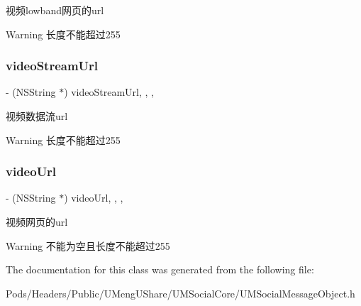 视频lowband网页的url

\begin{DoxyWarning}{Warning}
长度不能超过255 
\end{DoxyWarning}
\mbox{\label{interface_u_m_share_video_object_a540ba23d9e3ede766a837064fa78dead}} 
\subsubsection{\texorpdfstring{video\+Stream\+Url}{videoStreamUrl}}
{\footnotesize\ttfamily -\/ (N\+S\+String $\ast$) video\+Stream\+Url\hspace{0.3cm}{\ttfamily [read]}, {\ttfamily [write]}, {\ttfamily [nonatomic]}, {\ttfamily [strong]}}

视频数据流url

\begin{DoxyWarning}{Warning}
长度不能超过255 
\end{DoxyWarning}
\mbox{\label{interface_u_m_share_video_object_a02aeb6f54d2a0de5ef8023c31a031259}} 
\subsubsection{\texorpdfstring{video\+Url}{videoUrl}}
{\footnotesize\ttfamily -\/ (N\+S\+String $\ast$) video\+Url\hspace{0.3cm}{\ttfamily [read]}, {\ttfamily [write]}, {\ttfamily [nonatomic]}, {\ttfamily [strong]}}

视频网页的url

\begin{DoxyWarning}{Warning}
不能为空且长度不能超过255 
\end{DoxyWarning}


The documentation for this class was generated from the following file\+:\begin{DoxyCompactItemize}
\item 
Pods/\+Headers/\+Public/\+U\+Meng\+U\+Share/\+U\+M\+Social\+Core/U\+M\+Social\+Message\+Object.\+h\end{DoxyCompactItemize}
